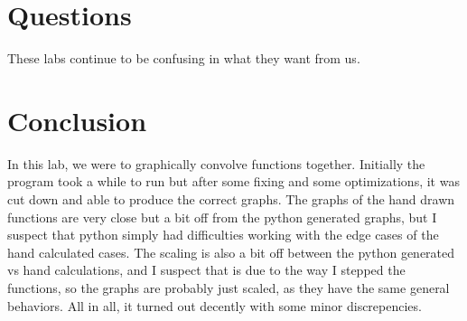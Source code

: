 \documentclass[12pt,a4paper]{article}
\begin{document}
\section{Questions}
    These labs continue to be confusing in what they want from us. 
\section{Conclusion}
In this lab, we were to graphically convolve functions together. Initially the program took a while to run but after some fixing and some optimizations, it was cut down and able to produce the correct graphs. The graphs of the hand drawn functions are very close but a bit off from the python generated graphs, but I suspect that python simply had difficulties working with the edge cases of the hand calculated cases. The scaling is also a bit off between the python generated vs hand calculations, and I suspect that is due to the way I stepped the functions, so the graphs are probably just scaled, as they have the same general behaviors. All in all, it turned out decently with some minor discrepencies. 
\end{document}
